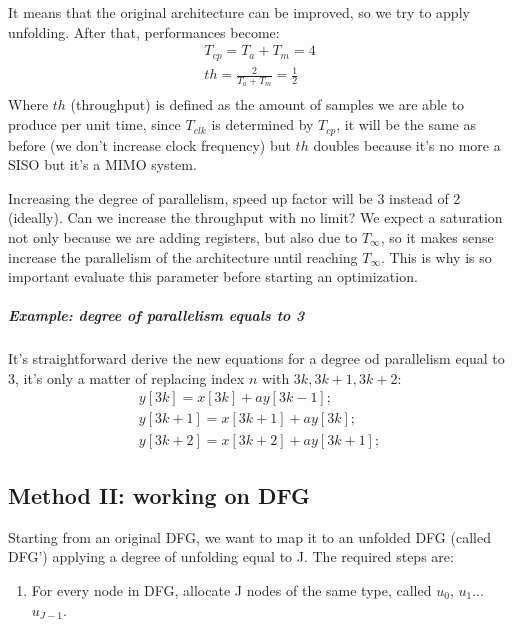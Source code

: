 It means that the original architecture can be improved, so we try to apply unfolding. After that, performances become:
\begin{eqnarray}
T_{cp}=T_a+T_m=4\\
th=\frac{2}{T_a+T_m}=\frac{1}{2}\\
\end{eqnarray}
Where $th$ (throughput) is defined as the amount of samples we are able to produce per unit time, since $T_{clk}$ is determined by $T_{cp}$, it will be the same as before (we don't increase clock frequency) but $th$ doubles because it's no more a SISO but it's a MIMO system.

Increasing the degree of parallelism, speed up factor will be 3 instead of 2 (ideally). Can we increase the throughput with no limit? We expect a saturation not only because we are adding registers, but also due to $T_{\infty}$, so it makes sense increase the parallelism of the architecture until reaching $T_{\infty}$. This is why is so important evaluate this parameter before starting an optimization.

\subparagraph{Example: degree of parallelism equals to 3}

It's straightforward derive the new equations for a degree od parallelism equal to 3, it's only a matter of replacing index $n$ with $3k, 3k+1, 3k+2$:
\begin{eqnarray}
y[3k]=x[3k]+ay[3k-1];\\
y[3k+1]=x[3k+1]+ay[3k];\\
y[3k+2]=x[3k+2]+ay[3k+1];
\end{eqnarray}

\subsection{Method II: working on DFG}

Starting from an original DFG, we want to map it to an unfolded DFG (called DFG') applying a degree of unfolding equal to J. The required steps are:
\begin{enumerate}
  \item For every node in DFG, allocate J nodes of the same type, called $u_0$, $u_1$...$u_{J-1}$.
\end{enumerate}

